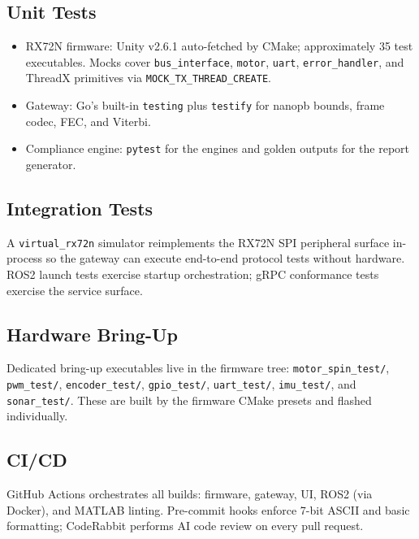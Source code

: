 \documentclass[11pt,letterpaper]{article}
\begin{document}
\subsection{Unit Tests}
\begin{itemize}[leftmargin=1.4em,itemsep=2pt]
\item RX72N firmware: Unity v2.6.1 auto-fetched by CMake;
      approximately 35 test executables. Mocks cover
      \texttt{bus\_interface}, \texttt{motor},
      \texttt{uart}, \texttt{error\_handler}, and ThreadX
      primitives via \texttt{MOCK\_TX\_THREAD\_CREATE}.
\item Gateway: Go's built-in \texttt{testing} plus
      \texttt{testify} for nanopb bounds, frame codec, FEC, and
      Viterbi.
\item Compliance engine: \texttt{pytest} for the engines and golden
      outputs for the report generator.
\end{itemize}

\subsection{Integration Tests}
A \texttt{virtual\_rx72n} simulator reimplements the RX72N SPI
peripheral surface in-process so the gateway can execute end-to-end
protocol tests without hardware. ROS2 launch tests exercise startup
orchestration; gRPC conformance tests exercise the service surface.

\subsection{Hardware Bring-Up}
Dedicated bring-up executables live in the firmware tree:
\texttt{motor\_spin\_test/}, \texttt{pwm\_test/},
\texttt{encoder\_test/}, \texttt{gpio\_test/}, \texttt{uart\_test/},
\texttt{imu\_test/}, and \texttt{sonar\_test/}. These are built by
the firmware CMake presets and flashed individually.

\subsection{CI/CD}
GitHub Actions orchestrates all builds: firmware, gateway, UI, ROS2
(via Docker), and MATLAB linting. Pre-commit hooks enforce 7-bit
ASCII and basic formatting; CodeRabbit performs AI code review on
every pull request.

\end{document}
